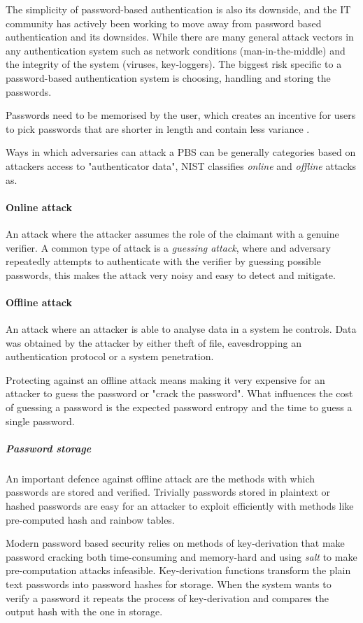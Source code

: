 The simplicity of password-based authentication is also its downside, and the IT community has actively been working to move away from password based authentication and its downsides.
While there are many general attack vectors in any authentication system such as network conditions (man-in-the-middle) and the integrity of the system (viruses, key-loggers). The biggest risk specific to a password-based authentication system is choosing, handling and storing the passwords.

Passwords need to be memorised by the user, which creates an incentive for users to pick passwords that are shorter in length and contain less variance \cite{conklin2004password}.

Ways in which adversaries can attack a PBS can be generally categories based on attackers access to "authenticator data", NIST \cite{grassi2017} classifies \textit{online} and \textit{offline} attacks as.

\paragraph{Online attack} An attack where the attacker assumes the role of the claimant with a genuine verifier.
A common type of attack is a \textit{guessing attack}, where and adversary repeatedly attempts to authenticate with the verifier by guessing possible passwords, this makes the attack very noisy and easy to detect and mitigate.


\paragraph{Offline attack} An attack where an attacker is able to analyse data in a system he controls. Data was obtained by the attacker by either theft of file, eavesdropping an authentication protocol or a system penetration.

Protecting against an offline attack means making it very expensive for an attacker to guess the password or "crack the password".
What influences the cost of guessing a password is the expected password entropy and the time to guess a single password.

\subparagraph{Password storage}
An important defence against offline attack are the methods with which passwords are stored and verified.
Trivially passwords stored in plaintext or hashed passwords are easy for an attacker to exploit efficiently with methods like pre-computed hash and rainbow tables. 

Modern password based security relies on methods of key-derivation that make password cracking both time-consuming and memory-hard \cite{percival2016scrypt, biryukov2016argon2, boneh2016balloon} and using \textit{salt} \cite{hornby2016salted} to make pre-computation attacks infeasible.
Key-derivation functions transform the plain text passwords into password hashes for storage.
When the system wants to verify a password it repeats the process of key-derivation and compares the output hash with the one in storage.

